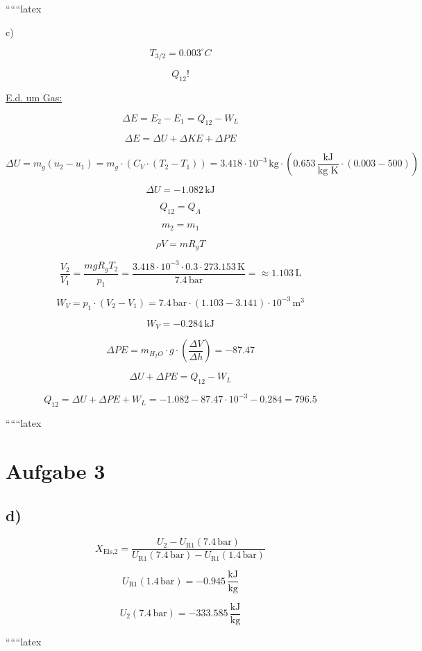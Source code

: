 ``````latex


c)

\[
T_{3/2} = 0.003^\circ C
\]

\[
Q_{12}!
\]

\underline{E.d. um Gas:}

\[
\Delta E = E_2 - E_1 = Q_{12} - W_L
\]

\[
\Delta E = \Delta U + \Delta KE + \Delta PE
\]

\[
\Delta U = m_g (u_2 - u_1) = m_g \cdot (C_V \cdot (T_2 - T_1)) = 3.418 \cdot 10^{-3} \, \text{kg} \cdot \left(0.653 \, \frac{\text{kJ}}{\text{kg K}} \cdot (0.003 - 500)\right)
\]

\[
\Delta U = -1.082 \, \text{kJ}
\]

\[
Q_{12} = Q_{A}
\]

\[
m_2 = m_1
\]

\[
\rho V = m R_g T
\]

\[
\frac{V_2}{V_1} = \frac{m g R_g T_2}{p_1} = \frac{3.418 \cdot 10^{-3} \cdot 0.3 \cdot 273.153 \, \text{K}}{7.4 \, \text{bar}} = \approx 1.103 \, \text{L}
\]

\[
W_V = p_1 \cdot (V_2 - V_1) = 7.4 \, \text{bar} \cdot (1.103 - 3.141) \cdot 10^{-3} \, \text{m}^3
\]

\[
W_V = -0.284 \, \text{kJ}
\]

\[
\Delta PE = m_{H_2O} \cdot g \cdot \left(\frac{\Delta V}{\Delta h}\right) = -87.47
\]

\[
\Delta U + \Delta PE = Q_{12} - W_L
\]

\[
Q_{12} = \Delta U + \Delta PE + W_L = -1.082 - 87.47 \cdot 10^{-3} - 0.284 = 796.5
\]

``````latex


\section*{Aufgabe 3}

\subsection*{d)}

\[
X_{\text{Eis,2}} = \frac{U_2 - U_{\text{R1}}(7.4 \, \text{bar})}{U_{\text{R1}}(7.4 \, \text{bar}) - U_{\text{R1}}(1.4 \, \text{bar})}
\]

\[
U_{\text{R1}}(1.4 \, \text{bar}) = -0.945 \, \frac{\text{kJ}}{\text{kg}}
\]

\[
U_2 (7.4 \, \text{bar}) = -333.585 \, \frac{\text{kJ}}{\text{kg}}
\]

``````latex


